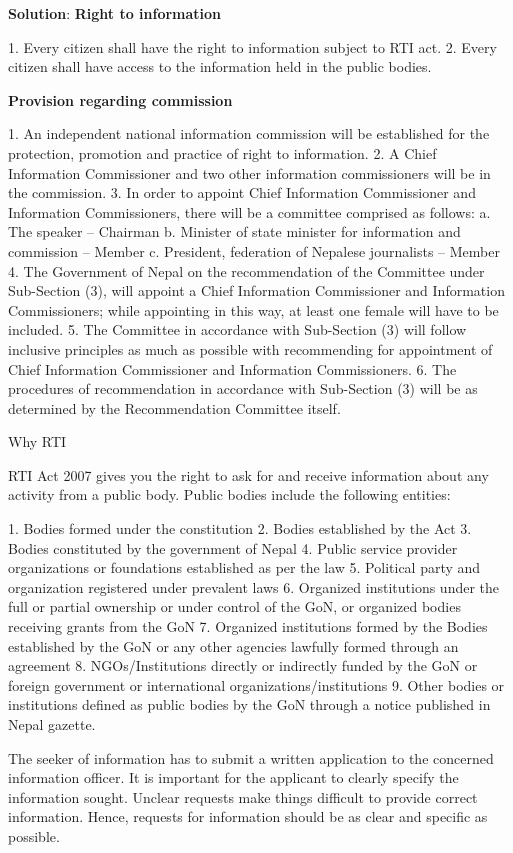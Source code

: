 \documentclass[
  openany]{book}
\newenvironment{solution}{ {\bfseries Solution}:}{}
\begin{document}
\begin{questions}
\begin{solution}
\textbf{Right to information}

1. Every citizen shall have the right to information subject to RTI act.
2. Every citizen shall have access to the information held in the public bodies.

\textbf{Provision regarding commission}

1. An independent national information commission will be established for the protection, promotion and practice of right to information.
2. A Chief Information Commissioner and two other information commissioners will be in the commission.
3. In order to appoint Chief Information Commissioner and Information Commissioners, there will be a committee comprised as follows:
  a. The speaker -- Chairman
  b. Minister of state minister for information and commission -- Member
  c. President, federation of Nepalese journalists -- Member
4. The Government of Nepal on the recommendation of the Committee under Sub-Section (3), will appoint a Chief Information Commissioner and Information Commissioners; while appointing in this way, at least one female will have to be included.
5. The Committee in accordance with Sub-Section (3) will follow inclusive principles as much as possible with recommending for appointment of Chief Information Commissioner and Information Commissioners.
6. The procedures of recommendation in accordance with Sub-Section (3) will be as determined by the Recommendation Committee itself.

Why RTI

RTI Act 2007 gives you the right to ask for and receive information about any activity from a public body. Public bodies include the following entities:

1. Bodies formed under the constitution
2. Bodies established by the Act
3. Bodies constituted by the government of Nepal
4. Public service provider organizations or foundations established as per the law
5. Political party and organization registered under prevalent laws
6. Organized institutions under the full or partial ownership or under control of the GoN, or organized bodies receiving grants from the GoN
7. Organized institutions formed by the Bodies established by the GoN or any other agencies lawfully formed through an agreement
8. NGOs/Institutions directly or indirectly funded by the GoN or foreign government or international organizations/institutions
9. Other bodies or institutions defined as public bodies by the GoN through a notice published in Nepal gazette.

The seeker of information has to submit a written application to the concerned information officer. It is important for the applicant to clearly specify the information sought. Unclear requests make things difficult to provide correct information. Hence, requests for information should be as clear and specific as possible.


\end{solution}
\end{questions}
\end{document}
